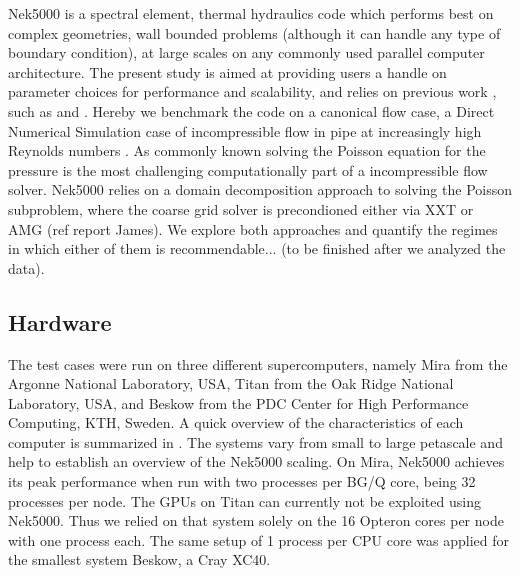 \documentclass{sig-alternate}
\begin{document}
Nek5000 is a spectral element, thermal hydraulics code which performs best on complex geometries, wall bounded problems (although it can handle any type of boundary condition), at large scales on any commonly used parallel computer architecture. The present study is aimed at providing users a handle on parameter choices for performance and scalability, and relies on previous work , such as \cite{fischer:scaling} and \cite{tufo:terascale}. Hereby we benchmark the code on a canonical flow case, a Direct Numerical Simulation case of incompressible flow in pipe at increasingly high Reynolds numbers \cite{Khoury2013}. As commonly known solving the Poisson equation for the pressure is the most challenging computationally part of a incompressible flow solver. Nek5000 relies on a domain decomposition approach to solving the Poisson subproblem, where the coarse grid solver is precondioned either via XXT \cite{Tufo2001151} or AMG (ref report James). We explore both approaches and quantify the regimes in which either of them is recommendable... (to be finished after we analyzed the data).

\subsection{Hardware}

The test cases were run on three different supercomputers, namely Mira from the
Argonne National Laboratory, USA, Titan from the Oak Ridge National Laboratory,
USA, and Beskow from the PDC Center for High Performance Computing, KTH, Sweden.
A quick overview of the characteristics of each computer is summarized in 
. The systems vary from small to large petascale and help to
establish an overview of the Nek5000 scaling. On Mira, Nek5000 achieves its
peak performance when run with two processes per BG/Q core, being 32 processes
per node. The GPUs on Titan can
currently not be exploited using Nek5000. Thus we relied on that system solely
on the 16 Opteron cores per node with one process each. The same setup of 1
process per CPU core was applied for the smallest system Beskow, a Cray XC40.
\end{document}
